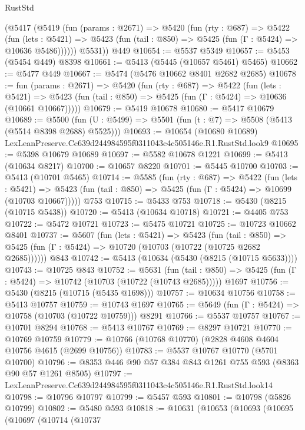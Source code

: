 \begin{lexlean}{RustStd}
\begin{coremodule}
      (@5417
        (@5419
          (fun (params : @2671) =>
          @5420
            (fun (rty : @687) =>
            @5422
              (fun (lets : @5421) =>
              @5423 (fun (tail : @850) => @5425 (fun (Γ : @5424) => @10636 @5486))))))
        @5531))
    @449
@10654 := @5537 @5349
@10657 := @5453 (@5454 @449) @8398
@10661 := @5413 (@5445 (@10657 @5461) @5465)
@10662 := @5477 @449
@10667 := @5474 (@5476 @10662 @8401 @2682 @2685)
@10678 := fun (params : @2671) =>
  @5420
    (fun (rty : @687) =>
    @5422
      (fun (lets : @5421) =>
      @5423 (fun (tail : @850) => @5425 (fun (Γ : @5424) => @10636 (@10661 @10667)))))
@10679 := @5419 @10678
@10680 := @5417 @10679
@10689 := @5500 (fun (U : @5499) => @5501 (fun (t : @7) => @5508 (@5413 (@5514 @8398 @2688) @5525)))
@10693 := @10654 (@10680 @10689) LexLeanPreserve.Cc639d244984595f0311043c4c505146e.R1.RustStd.look9
@10695 := @5398 @10679 @10689
@10697 := @5582 @10678 @1221
@10699 := @5413 (@10634 @8217)
@10700 := @10657 @8220
@10701 := @5445 @10700
@10703 := @5413 (@10701 @5465)
@10714 := @5585
    (fun (rty : @687) =>
    @5422
      (fun (lets : @5421) =>
      @5423 (fun (tail : @850) => @5425 (fun (Γ : @5424) => @10699 (@10703 @10667)))))
    @753
@10715 := @5433 @753
@10718 := @5430 (@8215 (@10715 @5438))
@10720 := @5413 (@10634 @10718)
@10721 := @4405 @753
@10722 := @5472 @10721
@10723 := @5475 @10721
@10725 := @10723 @10662 @8401
@10737 := @5607
    (fun (lets : @5421) =>
    @5423
      (fun (tail : @850) =>
      @5425 (fun (Γ : @5424) => @10720 (@10703 (@10722 (@10725 @2682 @2685))))))
    @843
@10742 := @5413 (@10634 (@5430 (@8215 (@10715 @5633))))
@10743 := @10725 @843
@10752 := @5631
    (fun (tail : @850) => @5425 (fun (Γ : @5424) => @10742 (@10703 (@10722 (@10743 @2685)))))
    @1697
@10756 := @5430 (@8215 (@10715 (@5435 @1698)))
@10757 := @10634 @10756
@10758 := @5413 @10757
@10759 := @10743 @1697
@10765 := @5649 (fun (Γ : @5424) => @10758 (@10703 (@10722 @10759))) @8291
@10766 := @5537 @10757
@10767 := @10701 @8294
@10768 := @5413 @10767
@10769 := @8297 @10721
@10770 := @10769 @10759
@10779 := @10766 (@10768 @10770) (@2828 @4608 @4604 @10756 @4615 (@2699 @10756))
@10783 := @5537 @10767 @10770 (@5701 @10700)
@10796 := @8353 @446 @90 @57 @384 @843 @1261 @755 @593 (@8363 @90 @57 @1261 @8505)
@10797 := LexLeanPreserve.Cc639d244984595f0311043c4c505146e.R1.RustStd.look14
@10798 := @10796 @10797
@10799 := @5457 @593
@10801 := @10798 (@5826 @10799)
@10802 := @5480 @593
@10818 := @10631
    (@10653
      (@10693
        (@10695
          (@10697
            (@10714
              (@10737

\end{coremodule}
\end{lexlean}
